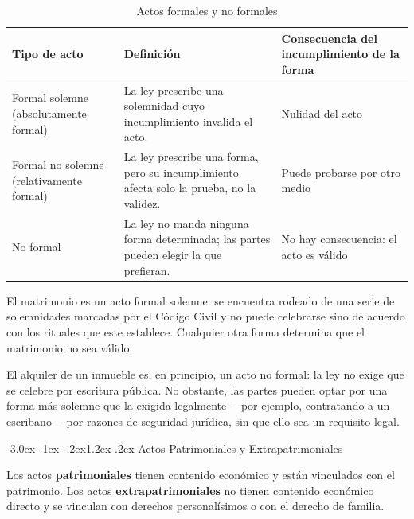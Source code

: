 \documentclass[12pt,oneside]{book}
\makeatletter
\renewcommand\section{\@startsection{section}{1}{\z@}%
  {-3.0ex \@plus -1ex \@minus -.2ex}{1.2ex \@plus .2ex}%
  {\normalfont\large\bfseries\color{acento}}}
\makeatother
\begin{document}
\begin{table}[H]
\centering
\begin{tabularx}{\textwidth}{l X X}
\toprule
\textbf{Tipo de acto} & \textbf{Definición} & \textbf{Consecuencia del incumplimiento de la forma} \\
\midrule
Formal solemne (absolutamente formal) & La ley prescribe una solemnidad cuyo incumplimiento invalida el acto. & Nulidad del acto \\
Formal no solemne (relativamente formal) & La ley prescribe una forma, pero su incumplimiento afecta solo la prueba, no la validez. & Puede probarse por otro medio \\
No formal & La ley no manda ninguna forma determinada; las partes pueden elegir la que prefieran. & No hay consecuencia: el acto es válido \\
\bottomrule
\end{tabularx}
\caption{Actos formales y no formales}
\end{table}

\begin{ejemplo}
El matrimonio es un acto formal solemne: se encuentra rodeado de una serie de solemnidades marcadas por el Código Civil y no puede celebrarse sino de acuerdo con los rituales que este establece. Cualquier otra forma determina que el matrimonio no sea válido.
\end{ejemplo}

\begin{ejemplo}
El alquiler de un inmueble es, en principio, un acto no formal: la ley no exige que se celebre por escritura pública. No obstante, las partes pueden optar por una forma más solemne que la exigida legalmente ---por ejemplo, contratando a un escribano--- por razones de seguridad jurídica, sin que ello sea un requisito legal.
\end{ejemplo}

\section{Actos Patrimoniales y Extrapatrimoniales}

\begin{definicion}
Los actos \textbf{patrimoniales} tienen contenido económico y están vinculados con el patrimonio. Los actos \textbf{extrapatrimoniales} no tienen contenido económico directo y se vinculan con derechos personalísimos o con el derecho de familia.
\end{definicion}
\end{document}
